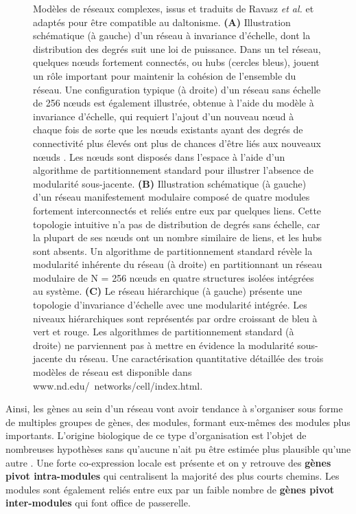 \begin{figure}[hp!]
    \caption[Modèles de réseaux complexes, issus et traduits de Ravasz \textit{et al.}]{Modèles de réseaux complexes, issus et traduits de Ravasz \textit{et al.} \cite{Ravasz2002} et adaptés pour être compatible au daltonisme. \textbf{(A)} Illustration schématique (à gauche) d'un réseau à invariance d'échelle, dont la distribution des degrés suit une loi de puissance. Dans un tel réseau, quelques nœuds fortement connectés, ou hubs (cercles bleus), jouent un rôle important pour maintenir la cohésion de l'ensemble du réseau. Une configuration typique (à droite) d'un réseau sans échelle de 256 nœuds est également illustrée, obtenue à l'aide du modèle à invariance d'échelle, qui requiert l'ajout d'un nouveau nœud à chaque fois de sorte que les nœuds existants ayant des degrés de connectivité plus élevés ont plus de chances d'être liés aux nouveaux nœuds \cite{Barabasi1999Oct}. Les nœuds sont disposés dans l'espace à l'aide d'un algorithme de partitionnement standard \cite{Batagelj1998} pour illustrer l'absence de modularité sous-jacente. \textbf{(B)} Illustration schématique (à gauche) d'un réseau manifestement modulaire composé de quatre modules fortement interconnectés et reliés entre eux par quelques liens. Cette topologie intuitive n'a pas de distribution de degrés sans échelle, car la plupart de ses nœuds ont un nombre similaire de liens, et les hubs sont absents. Un algorithme de partitionnement standard révèle la modularité inhérente du réseau (à droite) en partitionnant un réseau modulaire de N = 256 nœuds en quatre structures isolées intégrées au système. \textbf{(C)} Le réseau hiérarchique (à gauche) présente une topologie d'invariance d'échelle avec une modularité intégrée. Les niveaux hiérarchiques sont représentés par ordre croissant de bleu à vert et rouge. Les algorithmes de partitionnement standard (à droite) ne parviennent pas à mettre en évidence la modularité sous-jacente du réseau. Une caractérisation quantitative détaillée des trois modèles de réseau est disponible dans www.nd.edu/~networks/cell/index.html\footnotemark.}
    \label{fig:ravasz_hierarchical_clustering}
\end{figure}

Ainsi, les gènes au sein d'un réseau vont avoir tendance à s'organiser sous forme de multiples groupes de gènes, des \glspl{module}, formant eux-mêmes des modules plus importants. L'origine biologique de ce type d'organisation est l'objet de nombreuses hypothèses sans qu'aucune n'ait pu être estimée plus plausible qu'une autre \cite{Lorenz2011}. Une forte co-expression locale est présente et on y retrouve des \textbf{gènes pivot intra-modules} qui centralisent la majorité des plus courts chemins. Les modules sont également reliés entre eux par un faible nombre de \textbf{gènes pivot inter-modules} qui font office de passerelle.

